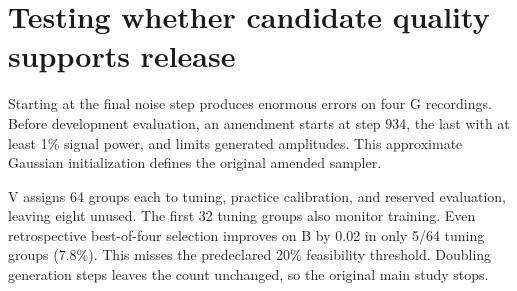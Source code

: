 \documentclass[runningheads,orivec]{llncs}
\begin{document}
\section{Testing whether candidate quality supports release}

Starting at the final noise step produces enormous errors on four G recordings. Before development evaluation, an amendment starts at step 934, the last with at least 1\% signal power, and limits generated amplitudes. This approximate Gaussian initialization \cite{lin} defines the original amended sampler.

V assigns 64 groups each to tuning, practice calibration, and reserved evaluation, leaving eight unused. The first 32 tuning groups also monitor training. Even retrospective best-of-four selection improves on B by 0.02 in only 5/64 tuning groups (7.8\%). This misses the predeclared 20\% feasibility threshold. Doubling generation steps leaves the count unchanged, so the original main study stops.
\end{document}
